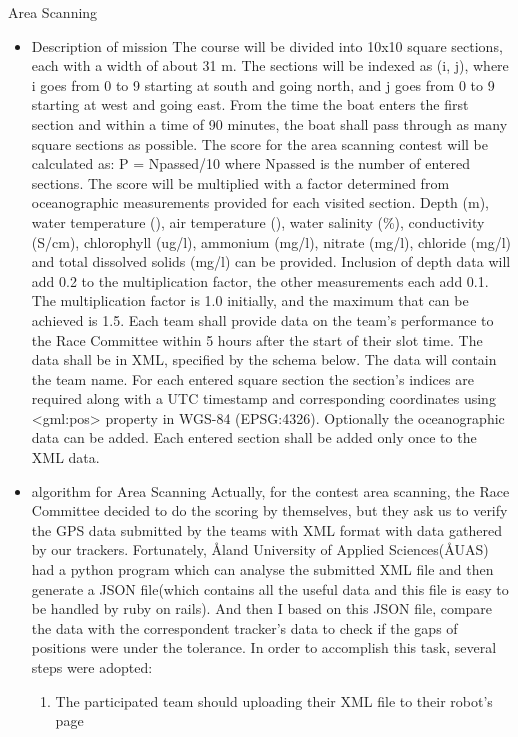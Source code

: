 \item{Area Scanning}
\begin{itemize}
\item{Description of mission}
The course will be divided into 10x10 square sections, each with a width of about 31 m. The sections will be indexed as (i, j), where i goes from 0 to 9 starting at south and going north, and j goes from 0 to 9 starting at west and going east. From the time the boat enters the first section and within a time of 90 minutes, the boat shall pass through as many square sections as possible. The score for the area scanning contest will be calculated as:
P = Npassed/10
where Npassed is the number of entered sections.
The score will be multiplied with a factor determined from oceanographic measurements provided for each visited section. Depth (m), water temperature (\textcelsius), air temperature (\textcelsius), water salinity (\%), conductivity (S/cm), chlorophyll (ug/l), ammonium (mg/l), nitrate (mg/l), chloride (mg/l) and total dissolved solids (mg/l) can be provided. Inclusion of depth data will add 0.2 to the multiplication factor, the other measurements each add 0.1. The multiplication factor is 1.0 initially, and the maximum that can be achieved is 1.5. Each team shall provide data on the team’s performance to the Race Committee within 5 hours after the start of their slot time. The data shall be in XML, specified by the schema below. The data will contain the team name. For each entered square section the section’s indices are required along with a UTC timestamp and corresponding coordinates using <gml:pos> property in WGS-84 (EPSG:4326). Optionally the oceanographic data can be added. Each entered section shall be added only once to the XML data.
\item{algorithm for Area Scanning}
Actually, for the contest area scanning, the Race Committee decided to do the scoring by themselves, but they ask us to verify the GPS data submitted by the teams with XML format with data gathered by our trackers. Fortunately, Åland University of Applied Sciences(ÅUAS) had a python program which can analyse the submitted XML file and then generate a JSON file(which contains all the useful data and this file is easy to be handled by ruby on rails). And then I based on this JSON file, compare the data with the correspondent tracker's data to check if the gaps of positions were under the tolerance. In order to accomplish this task, several steps were adopted:
\begin{enumerate}
\item The participated team should uploading their XML file to their robot's page


\end{enumerate}
\end{itemize}
